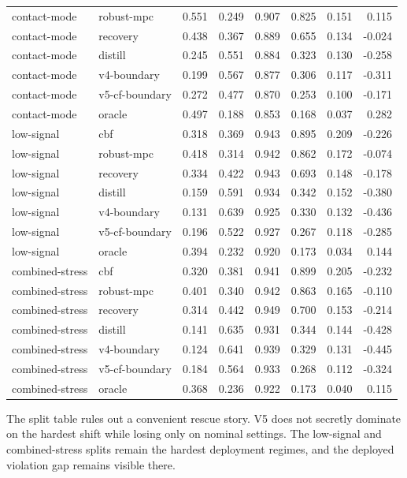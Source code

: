 \documentclass{article}
\begin{document}
\begin{longtable}{@{}llrrrrrr@{}}
contact-mode & robust-mpc & 0.551 & 0.249 & 0.907 & 0.825 & 0.151 & 0.115 \\
contact-mode & recovery & 0.438 & 0.367 & 0.889 & 0.655 & 0.134 & -0.024 \\
contact-mode & distill & 0.245 & 0.551 & 0.884 & 0.323 & 0.130 & -0.258 \\
contact-mode & v4-boundary & 0.199 & 0.567 & 0.877 & 0.306 & 0.117 & -0.311 \\
contact-mode & v5-cf-boundary & 0.272 & 0.477 & 0.870 & 0.253 & 0.100 & -0.171 \\
contact-mode & oracle & 0.497 & 0.188 & 0.853 & 0.168 & 0.037 & 0.282 \\
low-signal & cbf & 0.318 & 0.369 & 0.943 & 0.895 & 0.209 & -0.226 \\
low-signal & robust-mpc & 0.418 & 0.314 & 0.942 & 0.862 & 0.172 & -0.074 \\
low-signal & recovery & 0.334 & 0.422 & 0.943 & 0.693 & 0.148 & -0.178 \\
low-signal & distill & 0.159 & 0.591 & 0.934 & 0.342 & 0.152 & -0.380 \\
low-signal & v4-boundary & 0.131 & 0.639 & 0.925 & 0.330 & 0.132 & -0.436 \\
low-signal & v5-cf-boundary & 0.196 & 0.522 & 0.927 & 0.267 & 0.118 & -0.285 \\
low-signal & oracle & 0.394 & 0.232 & 0.920 & 0.173 & 0.034 & 0.144 \\
combined-stress & cbf & 0.320 & 0.381 & 0.941 & 0.899 & 0.205 & -0.232 \\
combined-stress & robust-mpc & 0.401 & 0.340 & 0.942 & 0.863 & 0.165 & -0.110 \\
combined-stress & recovery & 0.314 & 0.442 & 0.949 & 0.700 & 0.153 & -0.214 \\
combined-stress & distill & 0.141 & 0.635 & 0.931 & 0.344 & 0.144 & -0.428 \\
combined-stress & v4-boundary & 0.124 & 0.641 & 0.939 & 0.329 & 0.131 & -0.445 \\
combined-stress & v5-cf-boundary & 0.184 & 0.564 & 0.933 & 0.268 & 0.112 & -0.324 \\
combined-stress & oracle & 0.368 & 0.236 & 0.922 & 0.173 & 0.040 & 0.115 \\
\bottomrule
\end{longtable}
\endgroup


The split table rules out a convenient rescue story. V5 does not secretly dominate on the hardest shift while losing only on nominal settings. The low-signal and combined-stress splits remain the hardest deployment regimes, and the deployed violation gap remains visible there.
\end{document}
